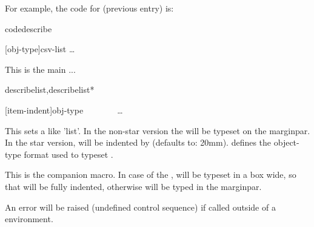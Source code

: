 \documentclass{article}
\begin{document}
For example, the code for   (previous entry) is:

\begin{codestore}[demoD]
\begin{codedescribe}[env,new=2023/05/01,update=2023/05/01,note={a note example},update=2024/02/16]{codedescribe}
  \begin{codesyntax}
    \tsmacro{\begin{codedescribe}}[obj-type]{csv-list}
    \ldots
    \tsmacro{\end{codedescribe}}{}
  \end{codesyntax}
  This is the main ...
\end{codedescribe}
\end{codestore}  


\begin{codedescribe}[env]{describelist,describelist*}
  \begin{codesyntax}
\tsmacro{\begin{describelist}}[item-indent]{obj-type}
  ~~
  ~~
  ~~\ldots
\tsmacro{\end{describelist}}{}
  \end{codesyntax}
This sets a  like 'list'. In the non-star version the  will be typeset on the marginpar. In the star version,  will be indented by  (defaults to: 20mm).
 defines the object-type format used to typeset . 
\end{codedescribe}

\begin{codedescribe}[code]{\describe}
\begin{codesyntax}
\end{codesyntax}
This is the  companion macro. In case of the ,  will be typeset in a box  wide, so that  will be fully indented, otherwise  will be typed in the marginpar.
\end{codedescribe}

\begin{tsremark}
An error will be raised (undefined control sequence) if called outside of a  environment.
\end{tsremark}
\end{document}
